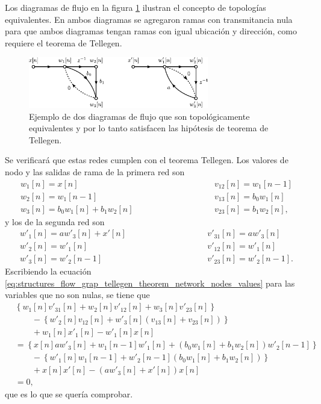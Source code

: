 \documentclass[a4paper]{report}
\begin{document}
Los diagramas de flujo en la figura \ref{fig:structures_flow_graph_tellegen_theorem_example} ilustran el concepto de topologías equivalentes. En ambos diagramas se agregaron ramas con transmitancia nula para que ambos diagramas tengan ramas con igual ubicación y dirección, como requiere el teorema de Tellegen.
\begin{figure}[!htb]
 \begin{center}
 \includegraphics[width=0.7\textwidth]{figuras/structures_flow_graph_tellegen_theorem_example.pdf}
 \caption{\label{fig:structures_flow_graph_tellegen_theorem_example} Ejemplo de dos diagramas de flujo que son topológicamente equivalentes y por lo tanto satisfacen las hipótesis de teorema de Tellegen.}
 \end{center}
\end{figure}
Se verificará que estas redes cumplen con el teorema Tellegen. Los valores de nodo y las salidas de rama de la primera red son
\[
 \begin{array}{lcl}
  w_1[n]=x[n]&\qquad\qquad\qquad\qquad &v_{12}[n]=w_1[n-1]\\
  w_2[n]=w_1[n-1]& &v_{13}[n]=b_0w_1[n]\\
  w_3[n]=b_0w_1[n]+b_1w_2[n]& &v_{23}[n]=b_1w_2[n],
 \end{array}
\]
y los de la segunda red son
\[
 \begin{array}{lcl}
  w'_1[n]=aw'_3[n]+x'[n]&\qquad\qquad\qquad\qquad &v'_{31}[n]=aw'_3[n]\\
  w'_2[n]=w'_1[n]& &v'_{12}[n]=w'_1[n]\\
  w'_3[n]=w'_2[n-1]& &v'_{23}[n]=w'_2[n-1].
 \end{array}
\]
Escribiendo la ecuación \ref{eq:structures_flow_grap_tellegen_theorem_network_nodes_values} para las variables que no son nulas, se tiene que 
\begin{align*}
 &\left\{w_1[n]v'_{31}[n]+w_2[n]v'_{12}[n]+w_3[n]v'_{23}[n]\right\}\\
 &\qquad-\left\{w'_2[n]v_{12}[n]+w'_3[n](v_{13}[n]+v_{23}[n])\right\}\\
 &\qquad+w_1[n]x'_1[n]-w'_1[n]x[n]\\
 &=\left\{x[n]aw'_3[n]+w_1[n-1]w'_1[n]+(b_0w_1[n]+b_1w_2[n])w'_2[n-1]\right\}\\
 &\qquad-\left\{w'_1[n]w_1[n-1]+w'_2[n-1](b_0w_1[n]+b_1w_2[n])\right\}\\
 &\qquad+x[n]x'[n]-(aw'_3[n]+x'[n])x[n]\\
 &=0,
\end{align*}
que es lo que se quería comprobar.
\end{document}
